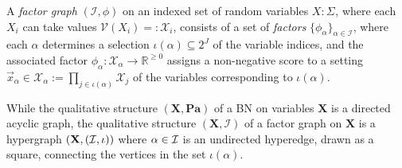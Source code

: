 \documentclass{article}
\theoremstyle{plain}
\theoremstyle{definition}
\theoremstyle{remark}
\newcommand{\note}[1]{{\color{blue}\ \!\Large\smash{\textbf{[}}{\normalsize\textsc{note:} #1}\ \!\smash{\textbf{]}}}}
\newcommand{\V}{\mathcal V}
\newcommand{\N}{\mathcal N}
\newcommand{\Ed}{\mathcal E}
\numberwithin{equation}{section}
\begin{document}
	\begin{fulldefn}
	A \emph{factor graph} $(\mathcal I, \phi)$ on an indexed set of random variables $X : \Sigma_{}$, where each $X_i$ can take values $\V(X_i) =: \mathcal X_i$, consists of  
	a set of \emph{factors} $\{\phi_\alpha\}_{\alpha \in \mathcal I }$, where each $\alpha$ determines a selection $\iota(\alpha) \subseteq 2^J$ of the variable indices, and the associated factor $\phi_\alpha \colon \mathcal X_\alpha \to \mathbb R^{\geq 0}$ assigns a non-negative score to a setting
	$\vec x_\alpha \in \mathcal X_\alpha := \prod_{j \in \iota(\alpha)} \mathcal X_j$ of the variables corresponding to $\iota(\alpha)$.

	\end{fulldefn}

	While the qualitative structure $(\mathbf X, \mathbf{Pa})$ of a BN on variables $\mathbf X$ is a directed acyclic graph, the qualitative structure $(\mathbf X, \mathcal I)$ of a factor graph on $\mathbf X$ is
	a hypergraph $(\mathbf X, (\cal I, \iota))$ where
		$\alpha \in \cal I$ is an undirected hyperedge, drawn as a
		square, connecting the vertices in the set $\iota(\alpha)$.  

\end{document}
